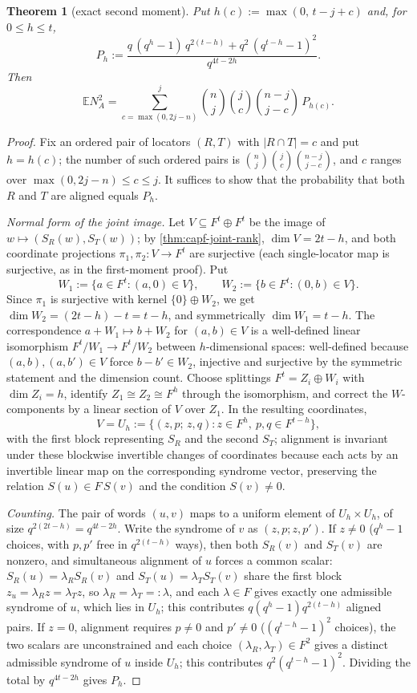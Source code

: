 \documentclass[11pt]{article}
\newtheorem{theorem}{Theorem}[section]
\theoremstyle{definition}
\theoremstyle{remark}
\providecommand{\E}{\mathbb E}
\begin{document}
\begin{theorem}[exact second moment]\label{thm:capf-second-moment}
Put $h(c):=\max(0,\,t-j+c)$ and, for $0\le h\le t$,
\[
P_h:=
\frac{q\,(q^h-1)\,q^{2(t-h)}+q^2\,(q^{t-h}-1)^2}{q^{4t-2h}} .
\]
Then
\[
\E N_A^2
=
\sum_{c=\max(0,2j-n)}^{j}
\binom{n}{j}\binom{j}{c}\binom{n-j}{j-c}\,
P_{h(c)} .
\]
\end{theorem}

\begin{proof}
Fix an ordered pair of locators $(R,T)$ with $|R\cap T|=c$ and put $h=h(c)$; the number of such ordered pairs is $\binom nj\binom jc\binom{n-j}{j-c}$, and $c$ ranges over $\max(0,2j-n)\le c\le j$.  It suffices to show that the probability that both $R$ and $T$ are aligned equals $P_h$.

\emph{Normal form of the joint image.}  Let $V\subseteq F^t\oplus F^t$ be the image of $w\mapsto(S_R(w),S_T(w))$; by \cref{thm:capf-joint-rank}, $\dim V=2t-h$, and both coordinate projections $\pi_1,\pi_2:V\to F^t$ are surjective \textup{(each single-locator map is surjective, as in the first-moment proof)}.  Put
\[
        W_1:=\{a\in F^t:(a,0)\in V\},
        \qquad
        W_2:=\{b\in F^t:(0,b)\in V\}.
\]
Since $\pi_1$ is surjective with kernel $\{0\}\oplus W_2$, we get $\dim W_2=(2t-h)-t=t-h$, and symmetrically $\dim W_1=t-h$.  The correspondence $a+W_1\mapsto b+W_2$ for $(a,b)\in V$ is a well-defined linear isomorphism $F^t/W_1\to F^t/W_2$ between $h$-dimensional spaces: well-defined because $(a,b),(a,b')\in V$ force $b-b'\in W_2$, injective and surjective by the symmetric statement and the dimension count.  Choose splittings $F^t=Z_i\oplus W_i$ with $\dim Z_i=h$, identify $Z_1\cong Z_2\cong F^h$ through the isomorphism, and correct the $W$-components by a linear section of $V$ over $Z_1$.  In the resulting coordinates,
\[
        V=U_h:=\{(z,p;\,z,q):z\in F^h,\ p,q\in F^{t-h}\},
\]
with the first block representing $S_R$ and the second $S_T$; alignment is invariant under these blockwise invertible changes of coordinates because each acts by an invertible linear map on the corresponding syndrome vector, preserving the relation $S(u)\in F\,S(v)$ and the condition $S(v)\ne0$.

\emph{Counting.}  The pair of words $(u,v)$ maps to a uniform element of $U_h\times U_h$, of size $q^{2(2t-h)}=q^{4t-2h}$.  Write the syndrome of $v$ as $(z,p;z,p')$.  If $z\ne0$ \textup{($q^h-1$ choices, with $p,p'$ free in $q^{2(t-h)}$ ways)}, then both $S_R(v)$ and $S_T(v)$ are nonzero, and simultaneous alignment of $u$ forces a common scalar: $S_R(u)=\lambda_R S_R(v)$ and $S_T(u)=\lambda_T S_T(v)$ share the first block $z_u=\lambda_Rz=\lambda_Tz$, so $\lambda_R=\lambda_T=:\lambda$, and each $\lambda\in F$ gives exactly one admissible syndrome of $u$, which lies in $U_h$; this contributes $q(q^h-1)q^{2(t-h)}$ aligned pairs.  If $z=0$, alignment requires $p\ne0$ and $p'\ne0$ \textup{($(q^{t-h}-1)^2$ choices)}, the two scalars are unconstrained and each choice $(\lambda_R,\lambda_T)\in F^2$ gives a distinct admissible syndrome of $u$ inside $U_h$; this contributes $q^2(q^{t-h}-1)^2$.  Dividing the total by $q^{4t-2h}$ gives $P_h$.
\end{proof}
\end{document}
